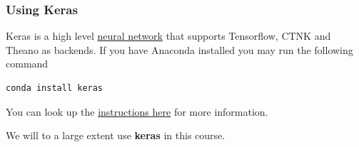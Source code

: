 \documentclass{beamer}
\begin{document}
\begin{frame}
\frametitle{Using Keras}

Keras is a high level \href{{https://en.wikipedia.org/wiki/Application_programming_interface}}{neural network}
that supports Tensorflow, CTNK and Theano as backends.  
If you have Anaconda installed you may run the following command


\begin{verbatim}
conda install keras

\end{verbatim}

You can look up the \href{{https://keras.io/}}{instructions here} for more information.

We will to a large extent use \textbf{keras} in this course.
\end{frame}
\end{document}
